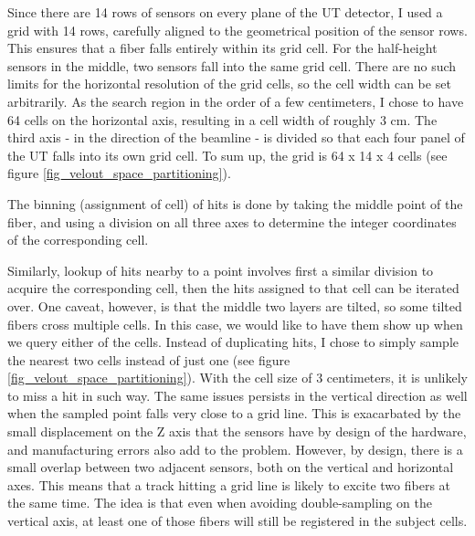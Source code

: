 \documentclass[12pt]{article}
\begin{document}
Since there are 14  rows of sensors on every plane of the UT detector, I used a grid with 14 rows, carefully aligned to the geometrical position of the sensor rows. This ensures that a fiber falls entirely within its grid cell. For the half-height sensors in the middle, two sensors fall into the same grid cell. There are no such limits for the horizontal resolution of the grid cells, so the cell width can be set arbitrarily. As the search region in the order of a few centimeters, I chose to have 64 cells on the horizontal axis, resulting in a cell width of roughly 3 cm. The third axis - in the direction of the beamline - is divided so that each four panel of the UT falls into its own grid cell. To sum up, the grid is 64 x 14 x 4 cells (see figure \ref{fig_velout_space_partitioning}).

The binning (assignment of cell) of hits is done by taking the middle point of the fiber, and using a division on all three axes to determine the integer coordinates of the corresponding cell.

Similarly, lookup of hits nearby to a point involves first a similar division to acquire the corresponding cell, then the hits assigned to that cell can be iterated over. One caveat, however, is that the middle two layers are tilted, so some tilted fibers cross multiple cells. In this case, we would like to have them show up when we query either of the cells. Instead of duplicating hits, I chose to simply sample the nearest two cells instead of just one (see figure \ref{fig_velout_space_partitioning}). With the cell size of 3 centimeters, it is unlikely to miss a hit in such way. The same issues persists in the vertical direction as well when the sampled point falls very close to a grid line. This is exacarbated by the small displacement on the Z axis that the sensors have by design of the hardware, and manufacturing errors also add to the problem. However, by design, there is a small overlap between two adjacent sensors, both on the vertical and horizontal axes. This means that a track hitting a grid line is likely to excite two fibers at the same time. The idea is that even when avoiding double-sampling on the vertical axis, at least one of those fibers will still be registered in the subject cells.
\end{document}
